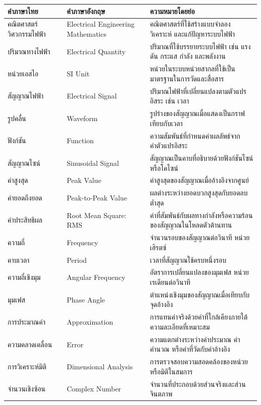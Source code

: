 \begin{table}[htbp]
    \centering
    \begin{tabular}{l l l}
        \hline
        \textbf{คำภาษาไทย} & \textbf{คำภาษาอังกฤษ} & \textbf{ความหมายโดยย่อ} \\
        \hline
        คณิตศาสตร์วิศวกรรมไฟฟ้า & Electrical Engineering Mathematics & คณิตศาสตร์ที่ใช้สร้างแบบจำลอง วิเคราะห์ และแก้ปัญหาระบบไฟฟ้า \\
        ปริมาณทางไฟฟ้า & Electrical Quantity & ปริมาณที่ใช้บรรยายระบบไฟฟ้า เช่น แรงดัน กระแส กำลัง และพลังงาน \\
        หน่วยเอสไอ & SI Unit & หน่วยในระบบหน่วยสากลที่ใช้เป็นมาตรฐานในการวัดและสื่อสาร \\
        สัญญาณไฟฟ้า & Electrical Signal & ปริมาณไฟฟ้าที่เปลี่ยนแปลงตามตัวแปรอิสระ เช่น เวลา \\
        รูปคลื่น & Waveform & รูปร่างของสัญญาณเมื่อแสดงเป็นกราฟเทียบกับเวลา \\
        ฟังก์ชัน & Function & ความสัมพันธ์ที่กำหนดค่าผลลัพธ์จากค่าตัวแปรอิสระ \\
        สัญญาณไซน์ & Sinusoidal Signal & สัญญาณเป็นคาบที่อธิบายด้วยฟังก์ชันไซน์หรือโคไซน์ \\
        ค่าสูงสุด & Peak Value & ค่าสูงสุดของสัญญาณเมื่ออ้างอิงจากศูนย์ \\
        ค่ายอดถึงยอด & Peak-to-Peak Value & ผลต่างระหว่างยอดบวกสูงสุดกับยอดลบต่ำสุด \\
        ค่าประสิทธิผล & Root Mean Square: RMS & ค่าที่สัมพันธ์กับผลทางกำลังหรือความร้อนของสัญญาณในโหลดตัวต้านทาน \\
        ความถี่ & Frequency & จำนวนรอบของสัญญาณต่อวินาที หน่วยเฮิรตซ์ \\
        คาบเวลา & Period & เวลาที่สัญญาณใช้ครบหนึ่งรอบ \\
        ความถี่เชิงมุม & Angular Frequency & อัตราการเปลี่ยนแปลงของมุมเฟส หน่วยเรเดียนต่อวินาที \\
        มุมเฟส & Phase Angle & ตำแหน่งเชิงมุมของสัญญาณเมื่อเทียบกับจุดอ้างอิง \\
        การประมาณค่า & Approximation & การแทนค่าจริงด้วยค่าที่ใกล้เคียงภายใต้ความละเอียดที่เหมาะสม \\
        ความคลาดเคลื่อน & Error & ความแตกต่างระหว่างค่าประมาณ ค่าคำนวณ หรือค่าที่วัดกับค่าอ้างอิง \\
        การวิเคราะห์มิติ & Dimensional Analysis & การตรวจสอบความสอดคล้องของหน่วยหรือมิติในสมการ \\
        จำนวนเชิงซ้อน & Complex Number & จำนวนที่ประกอบด้วยส่วนจริงและส่วนจินตภาพ \\

\end{tabular}
\end{table}
